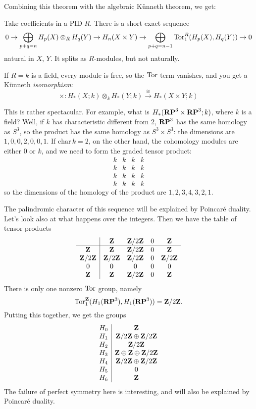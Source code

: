 Combining this theorem with the algebraic K\"unneth theorem, we get:
\begin{theorem}
Take coefficients in a PID $R$. There is a short exact sequence 
\begin{equation*}
0\to\bigoplus_{p+q=n} H_p(X)\otimes_RH_q(Y)\to
 H_n(X\times Y)\to\bigoplus_{p+q=n-1}\operatorname{Tor}^R_1( H_p(X), H_q(Y))\to 0
\end{equation*}
natural in $X$, $Y$. It splits as $R$-modules, but not naturally.
\end{theorem}
\begin{example}
If $R=k$ is a field, every module is free, so the $\operatorname{Tor}$ term vanishes, and you get a K\"{u}nneth {\em isomorphism}:
\begin{equation*}
\times: H_\ast(X;k)\otimes_k H_\ast(Y;k)\xrightarrow{\cong}H_\ast(X\times Y;k)
\end{equation*}
\end{example}
This is rather spectacular. For example, what is $ H_\ast(\mathbf{RP}^3\times\mathbf{RP}^3;k)$,
where $k$ is a field? Well, if $k$ has characteristic different from 2, 
$\mathbf{RP}^3$ has the same homology as $S^3$, so the product has the same 
homology as $S^3\times S^3$: the dimensions are $1,0,0,2,0,0,1$. 
If $\mathrm{char}\,k=2$, on the other hand, the cohomology modules are either
0 or $k$, and we need to form the graded tensor product:
\[
\begin{array}{cccc} k & k & k & k \\ k & k & k & k \\ 
k & k & k & k \\ k & k & k & k 
\end{array}
\]
so the dimensions of the homology of the product are 
$1,2,3,4,3,2,1$. 

The palindromic character of this sequence will be explained by Poincar\'e 
duality. Let's look also at what happens over the integers. Then we have 
the table of tensor products
\[
\begin{array}{c|cccc}
& \mathbf Z & \mathbf Z/2\mathbf Z & 0 & \mathbf Z \\
\hline
\mathbf Z & \mathbf Z & \mathbf Z/2\mathbf Z & 0 & \mathbf Z \\
\mathbf Z/2\mathbf Z & \mathbf Z/2\mathbf Z & \mathbf Z/2\mathbf Z & 0 & \mathbf Z/2\mathbf Z \\
0 & 0 & 0 & 0 & 0 \\
\mathbf Z & \mathbf Z & \mathbf Z/2\mathbf Z & 0 & \mathbf Z 
\end{array}
\]
There is only one nonzero $\operatorname{Tor}$ group, namely 
\[
\operatorname{Tor}_1^\mathbf Z(H_1(\mathbf{RP}^3),H_1(\mathbf{RP}^3))=\mathbf Z/2\mathbf Z.
\]
Putting this together, we get the groups
\[
\begin{array}{c|c}
H_0 & \mathbf Z \\
H_1 & \mathbf Z/2\mathbf Z\oplus\mathbf Z/2\mathbf Z\\
H_2 & \mathbf Z/2\mathbf Z \\
H_3 & \mathbf Z \oplus \mathbf Z \oplus\mathbf Z/2\mathbf Z \\
H_4 & \mathbf Z/2\mathbf Z\oplus\mathbf Z/2\mathbf Z\\
H_5 & 0 \\
H_6 & \mathbf Z
\end{array}
\]
The failure of perfect symmetry here is interesting, and will also be explained
by Poincar\'e duality. 






